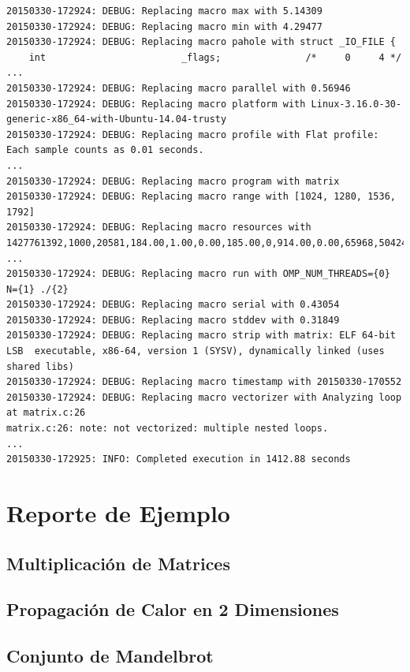 \documentclass[a4paper]{report}
\begin{document}
\begin{lstlisting}[caption={Salida de Ejemplo},basicstyle=\tiny,label={lst:log}]
20150330-172924: DEBUG: Replacing macro max with 5.14309
20150330-172924: DEBUG: Replacing macro min with 4.29477
20150330-172924: DEBUG: Replacing macro pahole with struct _IO_FILE {
	int                        _flags;               /*     0     4 */
...
20150330-172924: DEBUG: Replacing macro parallel with 0.56946
20150330-172924: DEBUG: Replacing macro platform with Linux-3.16.0-30-generic-x86_64-with-Ubuntu-14.04-trusty
20150330-172924: DEBUG: Replacing macro profile with Flat profile:
Each sample counts as 0.01 seconds.
...
20150330-172924: DEBUG: Replacing macro program with matrix
20150330-172924: DEBUG: Replacing macro range with [1024, 1280, 1536, 1792]
20150330-172924: DEBUG: Replacing macro resources with 1427761392,1000,20581,184.00,1.00,0.00,185.00,0,914.00,0.00,65968,50424,1.25
...
20150330-172924: DEBUG: Replacing macro run with OMP_NUM_THREADS={0} N={1} ./{2}
20150330-172924: DEBUG: Replacing macro serial with 0.43054
20150330-172924: DEBUG: Replacing macro stddev with 0.31849
20150330-172924: DEBUG: Replacing macro strip with matrix: ELF 64-bit LSB  executable, x86-64, version 1 (SYSV), dynamically linked (uses shared libs)
20150330-172924: DEBUG: Replacing macro timestamp with 20150330-170552
20150330-172924: DEBUG: Replacing macro vectorizer with Analyzing loop at matrix.c:26
matrix.c:26: note: not vectorized: multiple nested loops.
...
20150330-172925: INFO: Completed execution in 1412.88 seconds
\end{lstlisting}

\chapter{Reporte de Ejemplo} \label{examples}

\section{Multiplicación de Matrices}  \label{example-matrix}


\section{Propagación de Calor en 2 Dimensiones} \label{example-heat2d}


\section{Conjunto de Mandelbrot} \label{example-mandel}

\end{document}
